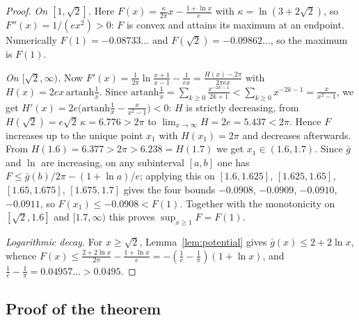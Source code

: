 ﻿\documentclass[11pt]{article}
\begin{document}
\begin{proof}
\emph{On $[1,\sqrt2]$.}  Here $F(x)=\frac{\kappa}{2\pi}x
-\frac{1+\ln x}{e}$ with $\kappa=\ln(3+2\sqrt2)$, so
$F''(x)=1/(ex^{2})>0$: $F$ is convex and attains its maximum at an
endpoint.  Numerically $F(1)=-0.08733\ldots$ and
$F(\sqrt2)=-0.09862\ldots$, so the maximum is $F(1)$.

\emph{On $[\sqrt2,\infty)$.}  Now
$F'(x)=\frac1{2\pi}\ln\frac{x+1}{x-1}-\frac1{ex}
=\frac{H(x)-2\pi}{2\pi e x}$ with
$H(x)=2ex\,\mathrm{artanh}\frac1x$.  Since
$\mathrm{artanh}\frac1x=\sum_{k\ge0}\frac{x^{-2k-1}}{2k+1}
<\sum_{k\ge0}x^{-2k-1}=\frac{x}{x^{2}-1}$, we get
$H'(x)=2e\bigl(\mathrm{artanh}\frac1x-\frac{x}{x^{2}-1}\bigr)<0$: $H$
is strictly decreasing, from $H(\sqrt2)=e\sqrt2\,\kappa=6.776>2\pi$ to
$\lim_{x\to\infty}H=2e=5.437<2\pi$.  Hence $F$ increases up to the
unique point $x_1$ with $H(x_1)=2\pi$ and decreases afterwards.  From
$H(1.6)=6.377>2\pi>6.238=H(1.7)$ we get $x_1\in(1.6,1.7)$.  Since
$\bar g$ and $\ln$ are increasing, on any subinterval $[a,b]$ one has
$F\le\bar g(b)/2\pi-(1+\ln a)/e$; applying this on $[1.6,1.625]$,
$[1.625,1.65]$, $[1.65,1.675]$, $[1.675,1.7]$ gives the four bounds
$-0.0908$, $-0.0909$, $-0.0910$, $-0.0911$, so
$F(x_1)\le-0.0908<F(1)$.  Together with the monotonicity on
$[\sqrt2,1.6]$ and $[1.7,\infty)$ this proves $\sup_{x\ge1}F=F(1)$.

\emph{Logarithmic decay.}  For $x\ge\sqrt2$,
Lemma~\ref{lem:potential} gives $\bar g(x)\le2+2\ln x$, whence
$F(x)\le\frac{2+2\ln x}{2\pi}-\frac{1+\ln x}{e}
=-(\frac1e-\frac1\pi)(1+\ln x)$, and
$\frac1e-\frac1\pi=0.04957\ldots>0.0495$.
\end{proof}

\subsection{Proof of the theorem}
\end{document}

